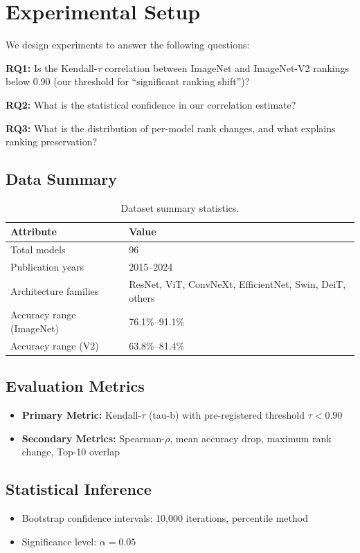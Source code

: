 \section{Experimental Setup}
\label{sec:experiments}

We design experiments to answer the following questions:

\textbf{RQ1:} Is the Kendall-$\tau$ correlation between ImageNet and ImageNet-V2 rankings below 0.90 (our threshold for ``significant ranking shift'')?

\textbf{RQ2:} What is the statistical confidence in our correlation estimate?

\textbf{RQ3:} What is the distribution of per-model rank changes, and what explains ranking preservation?

\subsection{Data Summary}

\begin{table}[h]
\centering
\caption{Dataset summary statistics.}
\label{tab:data_summary}
\begin{tabular}{@{}ll@{}}
\toprule
\textbf{Attribute} & \textbf{Value} \\
\midrule
Total models & 96 \\
Publication years & 2015--2024 \\
Architecture families & ResNet, ViT, ConvNeXt, EfficientNet, Swin, DeiT, others \\
Accuracy range (ImageNet) & 76.1\%--91.1\% \\
Accuracy range (V2) & 63.8\%--81.4\% \\
\bottomrule
\end{tabular}
\end{table}

\subsection{Evaluation Metrics}

\begin{itemize}
    \item \textbf{Primary Metric:} Kendall-$\tau$ (tau-b) with pre-registered threshold $\tau < 0.90$
    \item \textbf{Secondary Metrics:} Spearman-$\rho$, mean accuracy drop, maximum rank change, Top-10 overlap
\end{itemize}

\subsection{Statistical Inference}

\begin{itemize}
    \item Bootstrap confidence intervals: 10,000 iterations, percentile method
    \item Significance level: $\alpha = 0.05$
\end{itemize}
